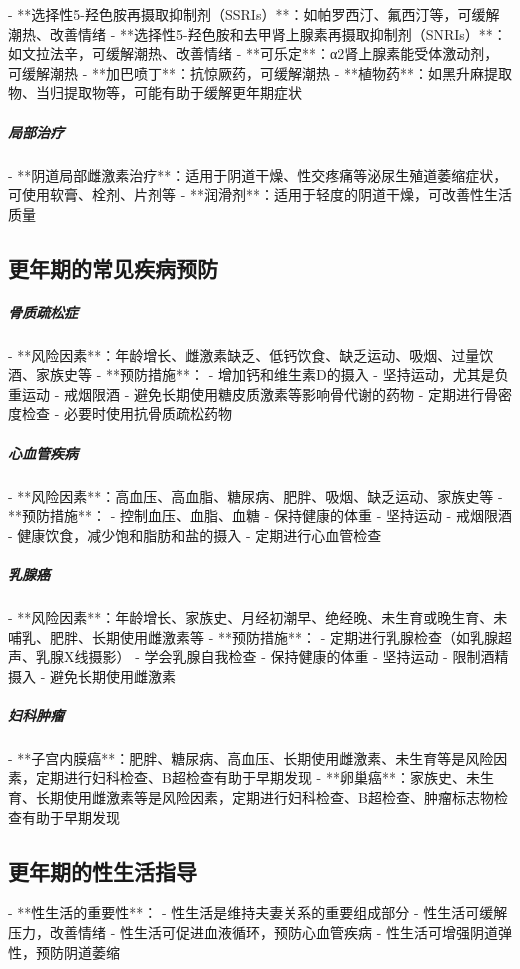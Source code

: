 \begin{enumerate}
- **选择性5-羟色胺再摄取抑制剂（SSRIs）**：如帕罗西汀、氟西汀等，可缓解潮热、改善情绪
- **选择性5-羟色胺和去甲肾上腺素再摄取抑制剂（SNRIs）**：如文拉法辛，可缓解潮热、改善情绪
- **可乐定**：α2肾上腺素能受体激动剂，可缓解潮热
- **加巴喷丁**：抗惊厥药，可缓解潮热
- **植物药**：如黑升麻提取物、当归提取物等，可能有助于缓解更年期症状

\subparagraph{局部治疗}

- **阴道局部雌激素治疗**：适用于阴道干燥、性交疼痛等泌尿生殖道萎缩症状，可使用软膏、栓剂、片剂等
- **润滑剂**：适用于轻度的阴道干燥，可改善性生活质量

\subsection{更年期的常见疾病预防}

\subparagraph{骨质疏松症}

- **风险因素**：年龄增长、雌激素缺乏、低钙饮食、缺乏运动、吸烟、过量饮酒、家族史等
- **预防措施**：
  - 增加钙和维生素D的摄入
  - 坚持运动，尤其是负重运动
  - 戒烟限酒
  - 避免长期使用糖皮质激素等影响骨代谢的药物
  - 定期进行骨密度检查
  - 必要时使用抗骨质疏松药物

\subparagraph{心血管疾病}

- **风险因素**：高血压、高血脂、糖尿病、肥胖、吸烟、缺乏运动、家族史等
- **预防措施**：
  - 控制血压、血脂、血糖
  - 保持健康的体重
  - 坚持运动
  - 戒烟限酒
  - 健康饮食，减少饱和脂肪和盐的摄入
  - 定期进行心血管检查

\subparagraph{乳腺癌}

- **风险因素**：年龄增长、家族史、月经初潮早、绝经晚、未生育或晚生育、未哺乳、肥胖、长期使用雌激素等
- **预防措施**：
  - 定期进行乳腺检查（如乳腺超声、乳腺X线摄影）
  - 学会乳腺自我检查
  - 保持健康的体重
  - 坚持运动
  - 限制酒精摄入
  - 避免长期使用雌激素

\subparagraph{妇科肿瘤}

- **子宫内膜癌**：肥胖、糖尿病、高血压、长期使用雌激素、未生育等是风险因素，定期进行妇科检查、B超检查有助于早期发现
- **卵巢癌**：家族史、未生育、长期使用雌激素等是风险因素，定期进行妇科检查、B超检查、肿瘤标志物检查有助于早期发现

\subsection{更年期的性生活指导}

- **性生活的重要性**：
  - 性生活是维持夫妻关系的重要组成部分
  - 性生活可缓解压力，改善情绪
  - 性生活可促进血液循环，预防心血管疾病
  - 性生活可增强阴道弹性，预防阴道萎缩


\end{enumerate}
